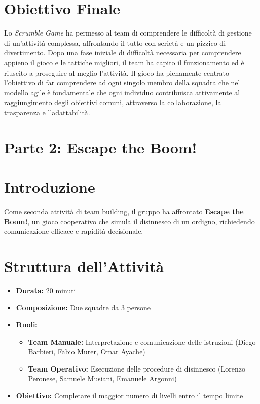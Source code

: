 \documentclass{article}
\begin{document}
\section*{Obiettivo Finale}
Lo \textit{Scrumble Game} ha permesso al team di comprendere le difficoltà di gestione di un'attività complessa, affrontando il tutto con serietà e un pizzico di divertimento. 
Dopo una fase iniziale di difficoltà necessaria per comprendere appieno il gioco e le tattiche migliori, il team ha capito il funzionamento ed è riuscito a proseguire al meglio l'attività.
Il gioco ha pienamente centrato l'obiettivo di far comprendere ad ogni singolo membro della squadra che nel modello agile è fondamentale che ogni individuo contribuisca attivamente al raggiungimento degli obiettivi comuni, attraverso la collaborazione, la trasparenza e l'adattabilità.


\section*{Parte 2: Escape the Boom!}

\section*{Introduzione}
Come seconda attività di team building, il gruppo ha affrontato \textbf{Escape the Boom!}, un gioco cooperativo che simula il disinnesco di un ordigno, richiedendo comunicazione efficace e rapidità decisionale.

\section*{Struttura dell'Attività}
\begin{itemize}
    \item \textbf{Durata:} 20 minuti
    \item \textbf{Composizione:} Due squadre da 3 persone
    \item \textbf{Ruoli:}
    \begin{itemize}
        \item \textbf{Team Manuale:} Interpretazione e comunicazione delle istruzioni
        (Diego Barbieri, Fabio Murer, Omar Ayache)
        \item \textbf{Team Operativo:} Esecuzione delle procedure di disinnesco
        (Lorenzo Peronese, Samuele Musiani, Emanuele Argonni)
    \end{itemize}
    \item \textbf{Obiettivo:} Completare il maggior numero di livelli entro il tempo limite
\end{itemize}
\end{document}

